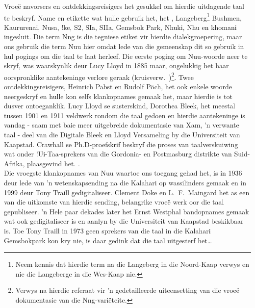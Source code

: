 Vroe\"{e} navorsers en ontdekkingsreisigers het gesukkel om hierdie
uitdagende taal te beskryf. Name en etikette wat hulle gebruik het,
het \textipa{\textdoublevertline}, Langeberg\footnote{Neem
kennis dat hierdie term na die Langeberg in die Noord-Kaap verwys en
nie die Langeberge in die Wes-Kaap nie.} Bushmen,
\textipa{\textdoublebarpipe}Kaurure\textipa{\textdoublevertline}nai,
N\textipa{\textvertline}usa, \textipa{\textdoublevertline}
!ke, S2, SIa, SIIa, Gemsbok Park, N\textipa{\textvertline}huki,
N\textipa{\textvertline}hu en \textipa{\textdoublebarpipe}khomani
ingesluit.  Die term N\textipa{\textdoublevertline}ng is die tegniese
etiket vir hierdie dialekgroepering, maar ons gebruik die term
N\textipa{\textvertline}uu hier omdat lede van die gemeenskap dit so
gebruik in hul pogings om die taal te laat herleef.  Die eerste poging
om N\textipa{\textvertline}uu-woorde neer te skryf, was waarskynlik
deur Lucy Lloyd in 1885 maar, ongelukkig het haar oorspronklike
aantekeninge verlore geraak (kruisverw.\
\cite{Gueldemann2017})\footnote{Verwys na hierdie referaat vir 'n
gedetailleerde uiteensetting van die vroe\"{e} dokumentasie van die
N\textipa{\textdoublevertline}ng-vari\"{e}teite.}. Twee
ontdekkingsreisigers, Heinrich Pabst en Rudolf P\"{o}ch, het ook
enkele woorde neergeskryf en hulle kon selfs klankopnames gemaak het,
maar hierdie is tot dusver ontoeganklik. Lucy Lloyd se susterskind,
Dorothea Bleek, het meestal tussen 1901 en 1911 veldwerk rondom die
taal gedoen en hierdie aantekeninge is vandag - saam met baie meer
uitgebreide dokumentasie van \textipa{\textvertline}Xam, 'n verwante
taal - deel van die Digitale Bleek en Lloyd Versameling by die
Universiteit van Kaapstad. Crawhall se Ph.D-proefskrif beskryf die
proses van taalverskuiwing wat onder !Ui-Taa-sprekers van die
Gordonia- en Postmasburg distrikte van Suid-Afrika, plaasgevind het.
\parencite{Crawhall2004}.\\

Die vroegste klankopnames van N\textipa{\textvertline}uu waartoe ons
toegang gehad het, is in 1936 deur lede van 'n wetenskapsending na die
Kalahari op wassilinders gemaak en in 1999 deur Tony Traill
gedigitaliseer.  Clement Doke en L.\ F.\ Maingard het as een van die
uitkomste van hierdie sending, belangrike vroe\"{e} werk oor die taal
gepubliseer.  'n Hele paar dekades later het Ernst Westphal
bandopnames gemaak wat ook gedigitaliseer is en aanlyn by die
Universiteit van Kaapstad beskikbaar is. Toe Tony Traill in 1973 geen
sprekers van die taal in die Kalahari Gemsbokpark kon kry nie, is daar
gedink dat die taal uitgesterf het\ldots


